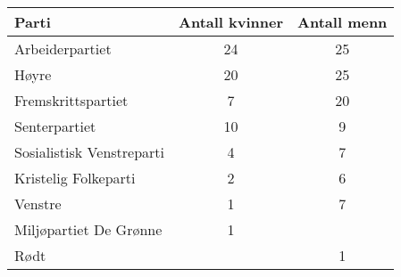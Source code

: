 %



\Oppgave[4] %

\begin{table}[H]
  \centering
  \caption{}
  \begin{tabularx}{\textwidth}{| X | *{2}{S[table-format=2.0]|}}
    \Rowcolor
    Parti  \headerstrut & {Antall kvinner} & {Antall menn} \\ \hline
    Arbeiderpartiet           &        24        &      25 \\ \hline
    Høyre                     &        20        &      25 \\ \hline
    Fremskrittspartiet        &         7        &      20 \\ \hline
    Senterpartiet             &        10        &       9 \\ \hline
    Sosialistisk Venstreparti &         4        &       7 \\ \hline
    Kristelig Folkeparti      &         2        &       6 \\ \hline
    Venstre                   &         1        &       7 \\ \hline
    Miljøpartiet De Grønne    &         1        &         \\ \hline
    Rødt                      &                  &       1 \\ \hline
  \end{tabularx}
  \label{tab:del-1-oppgave-2.1}
\end{table}

